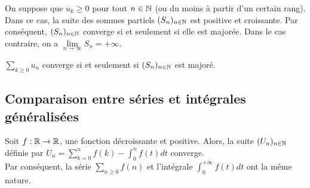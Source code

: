 \documentclass[../main.tex]{subfile}
\begin{document}
On suppose que $u_k \geq 0$ pour tout $n \in \mathbb{N}$ (ou du moins à partir d'un certain rang).
Dans ce cas, la suite des sommes partiels $(S_n)_{n \in \mathbb{N}}$ est positive et croissante.
Par conséquent, $(S_n)_{n \in \mathbb{N}}$ converge si et seulement si elle est majorée.
Dans le cas contraire, on a $\lim\limits_{n \to \infty} S_n = + \infty$.

\begin{theo}
	$\sum\limits_{k \geq 0} u_n$ converge si et seulement si $(S_n)_{n \in \mathbb{N}}$ est majoré.
\end{theo}

\subsection{Comparaison entre séries et intégrales généralisées}

\begin{theo}
	Soit $f: \mathbb{R} \to \mathbb{R}$, une fonction décroissante et positive.
	Alors, la suite $(U_n)_{n \in \mathbb{N}}$ définie par $U_n = \sum\limits_{k = 0}^n f(k) - \int_0^n f(t)dt$ converge.\\
	Par conséquent, la série $\sum\limits_{n \geq 0} f(n)$ et l'intégrale $\int_0^{+\infty} f(t) dt$ ont la même nature.
\end{theo}
\end{document}
